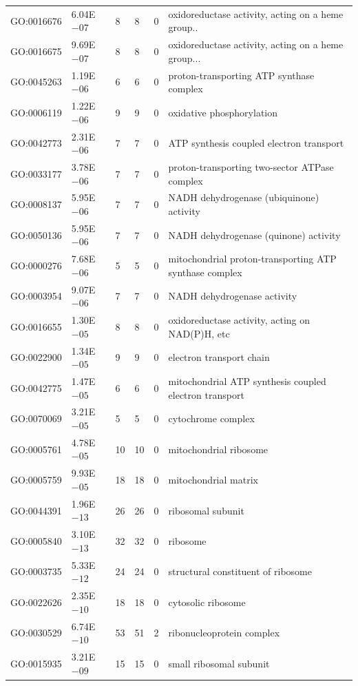 \begin{longtable}{| p{} | p{} |p{} | p{} |p{} | p{} |}
		GO:0016676 & 6.04E$-07$ & 8 & 8 & 0 & oxidoreductase activity, acting on a heme group.. \\ 
		GO:0016675 & 9.69E$-07$ & 8 & 8 & 0 & oxidoreductase activity, acting on a heme group... \\ 
		GO:0045263 & 1.19E$-06$ & 6 & 6 & 0 & proton-transporting ATP synthase complex \\ 
		GO:0006119 & 1.22E$-06$ & 9 & 9 & 0 & oxidative phosphorylation \\ 
		GO:0042773 & 2.31E$-06$ & 7 & 7 & 0 & ATP synthesis coupled electron transport \\ 
		GO:0033177 & 3.78E$-06$ & 7 & 7 & 0 & proton-transporting two-sector ATPase complex \\ 
		GO:0008137 & 5.95E$-06$ & 7 & 7 & 0 & NADH dehydrogenase (ubiquinone) activity \\ 
		GO:0050136 & 5.95E$-06$ & 7 & 7 & 0 & NADH dehydrogenase (quinone) activity \\ 
		GO:0000276 & 7.68E$-06$ & 5 & 5 & 0 & mitochondrial proton-transporting ATP synthase complex \\ 
		GO:0003954 & 9.07E$-06$ & 7 & 7 & 0 & NADH dehydrogenase activity \\ 
		GO:0016655 & 1.30E$-05$ & 8 & 8 & 0 & oxidoreductase activity, acting on NAD(P)H, etc \\ 
		GO:0022900 & 1.34E$-05$ & 9 & 9 & 0 & electron transport chain \\ 
		GO:0042775 & 1.47E$-05$ & 6 & 6 & 0 & mitochondrial ATP synthesis coupled electron transport \\ 
		GO:0070069 & 3.21E$-05$ & 5 & 5 & 0 & cytochrome complex \\ 
		GO:0005761 & 4.78E$-05$ & 10 & 10 & 0 & mitochondrial ribosome \\ 
		GO:0005759 & 9.93E$-05$ & 18 & 18 & 0 & mitochondrial matrix \\ 
		GO:0044391 & 1.96E$-13$ & 26 & 26 & 0 & ribosomal subunit \\ 
		GO:0005840 & 3.10E$-13$ & 32 & 32 & 0 & ribosome \\ 
		GO:0003735 & 5.33E$-12$ & 24 & 24 & 0 & structural constituent of ribosome \\ 
		GO:0022626 & 2.35E$-10$ & 18 & 18 & 0 & cytosolic ribosome \\ 
		GO:0030529 & 6.74E$-10$ & 53 & 51 & 2 & ribonucleoprotein complex \\ 
		GO:0015935 & 3.21E$-09$ & 15 & 15 & 0 & small ribosomal subunit \\ 

\end{longtable}
